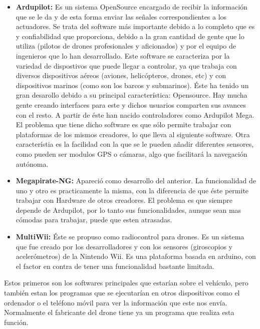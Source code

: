 	\begin{itemize}
		\item \textbf{Ardupilot:} Es un sistema OpenSource encargado de recibir la informaci\'on que se le da y de esta forma enviar las señales correspondientes a los actuadores. Se trata del software m\'as importante debido a lo completo que es y confiabilidad que proporciona, debido a la gran cantidad de gente que lo utiliza (pilotos de drones profesionales y aficionados) y por el equipo de ingenieros que lo han desarrollado. Este software se caracteriza por la variedad de dispostivos que puede llegar a controlar, ya que trabaja con diversos dispositivos a\'ereos (aviones, helic\'opteros, drones, etc) y con dispositivos marinos (como son los barcos y submarinos). \'Este ha tenido un gran desarollo debido a su principal caracter\'istica: Opensource. Hay mucha gente creando interfaces para este y dichos usuarios comparten sus avances con el resto. A partir de \'este han nacido controladores como Ardupilot Mega. El problema que tiene dicho software es que s\'olo permite trabajar con plataformas de los mismos creadores, lo que lleva al siguiente software. Otra caracter\'istia es la facilidad con la que se le pueden añadir diferentes sensores, como pueden ser modulos GPS o c\'amaras, algo que facilitar\'a la navegaci\'on aut\'onoma. 

	\item \textbf{Megapirate-NG:} Apareci\'o como desarrollo del anterior. La funcionalidad de uno y otro es practicamente la misma, con la diferencia de que \'este permite trabajar con Hardware de otros creadores. El problema es que siempre depende de Ardupilot, por lo tanto sus funcionalidades, aunque sean mas c\'omodas para trabajar, puede que esten atrasadas.

		\item \textbf{MultiWii:} \'Este se propuso como radiocontrol para drones. Es un sistema que fue creado por los desarrolladores y con los sensores (giroscopios y aceler\'ometros) de la Nintendo Wii. Es una plataforma basada en arduino, con el factor en contra de tener una funcionalidad bastante limitada. 
	\end{itemize}


Estos primeros son los softwares principales que estar\'ian sobre el veh\'iculo, pero tambi\'en estan los programas que se ejecutar\'ian en otros dispositivos como el ordenador o el tel\'efono m\'ovil para ver la informaci\'on que este nos env\'ia. Normalmente el fabricante del drone tiene ya un programa que realiza esta funci\'on. 

